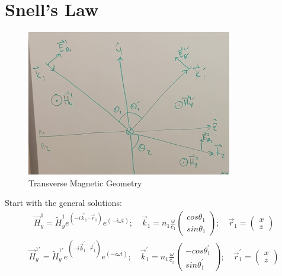 \documentclass{article}
\begin{document}
\clearpage
\section{Snell's Law}

\noindent

\begin{figure}[ht!]
    \centering
    \includegraphics[width=0.8\textwidth]{TMG.jpg}
    \caption{Transverse Magnetic Geometry}
    \label{fig:my_label}
\end{figure}
Start with the general solutions:
\begin{align}
\vec{H}_{y}^{1} = \tilde{H}_{y}^{1} e^{\left( -i \vec{k}_{1} \cdot \vec{r}_{1} \right)} e^ {\left(-i \omega t \right)}; \quad 
\vec{k}_{1} = n_{1} \frac{\omega}{c_{1}} 
\begin{pmatrix}
	cos{\theta_{1}} \\
	sin{\theta_{1}}
\end{pmatrix}; \quad
\vec{r}_{1} = 
\begin{pmatrix}
	x \\
	z
\end{pmatrix}
\end{align}
\begin{align}
\vec{H}_{y}^{1'} = \tilde{H}_{y}^{1'} e^{\left( -i \vec{k}_{1}^{'} \cdot \vec{r}_{1}^{'} \right)} e^ {\left(-i \omega t \right)}; \quad 
\vec{k}_{1}^{'} = n_{1} \frac{\omega}{c_{1}} 
\begin{pmatrix}
	-cos{\theta_{1}^{'}}\\
	sin{\theta_{1}^{'}}
\end{pmatrix}; \quad
\vec{r}_{1}^{'} = 
\begin{pmatrix}
	x \\
	z
\end{pmatrix}
\end{align}
\end{document}
